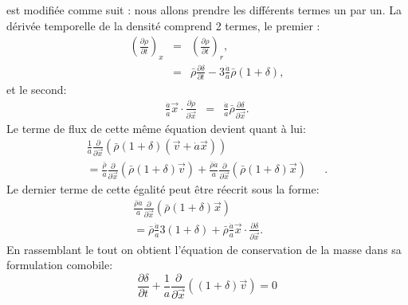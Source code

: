   est modifiée comme suit : nous allons prendre les différents termes un par un. La dérivée temporelle de la densité comprend 2 termes, le premier :
 \begin{eqnarray}
  \left(\frac{\partial \rho}{\partial t}\right)_x&=& \left(\frac{\partial \rho}{\partial t}\right)_r,\\
  &=&\bar \rho\frac{\partial \delta}{\partial t} -3\frac{\dot a}{a}\bar \rho (1+\delta),
 \end{eqnarray}
et le second:
\begin{eqnarray}
\frac{\dot a}{a}\vec x \cdot \frac{\partial \rho}{\partial \vec x}&=&\frac{\dot a }{a}\bar \rho \frac{\partial\delta}{\partial \vec x}.
\end{eqnarray}
Le terme de flux de cette même équation devient quant à lui:
\begin{eqnarray}
\frac{1}{a}\frac{\partial}{\partial \vec x}(\bar \rho(1+\delta)(\vec v + \dot a \vec x))&&\\
=\frac{\bar \rho}{a} \frac{\partial}{\partial \vec x}(\bar \rho(1+\delta)\vec v) + \frac{\bar \rho \dot a}{a} \frac{\partial}{\partial \vec x}(\bar \rho(1+\delta)\vec x)&&.
\end{eqnarray}
Le dernier terme de cette égalité peut être réecrit sous la forme:
\begin{eqnarray}
\frac{\bar \rho \dot a}{a} \frac{\partial}{\partial \vec x}(\bar \rho(1+\delta)\vec x)&&\\
=\bar \rho \frac{\dot a }{a} 3(1+\delta) +\bar \rho \frac{\dot a }{a} \vec x \cdot \frac{\partial \delta}{\partial \vec x}.
\end{eqnarray}
En rassemblant le tout on obtient l'équation de conservation de la masse dans sa formulation comobile:
\begin{equation}
\frac{\partial \delta}{\partial t}+\frac{1}{a}\frac{\partial}{\partial \vec x}((1+\delta)\vec v)=0
\end{equation}

